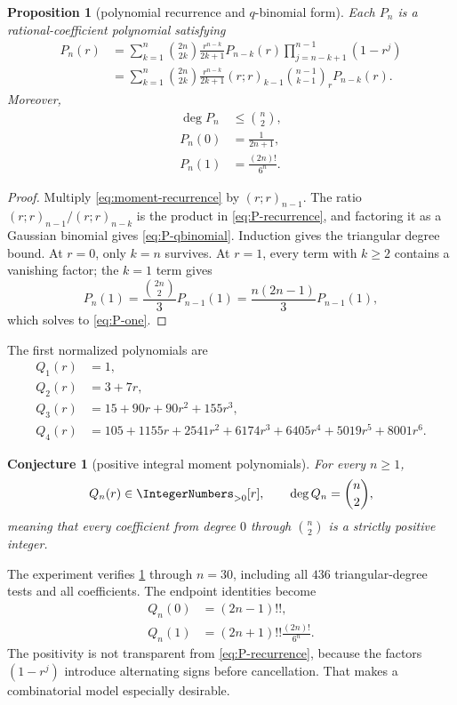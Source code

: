 \documentclass[11pt,oneside]{article}
\newtheorem{proposition}[theorem]{Proposition}
\newtheorem{conjecture}[theorem]{Conjecture}
\theoremstyle{definition}
\theoremstyle{remark}
\begin{document}
\begin{proposition}[polynomial recurrence and $q$-binomial form]\label{prop:P-recurrence}
Each $P_n$ is a rational-coefficient polynomial satisfying
\begin{align}
 P_n(r)
 &=\sum_{k=1}^n\binom{2n}{2k}\frac{r^{n-k}}{2k+1}
 P_{n-k}(r)\prod_{j=n-k+1}^{n-1}(1-r^j)\label{eq:P-recurrence}\\
 &=\sum_{k=1}^n\binom{2n}{2k}\frac{r^{n-k}}{2k+1}
 (r;r)_{k-1}\binom{n-1}{k-1}_rP_{n-k}(r).
 \label{eq:P-qbinomial}
\end{align}
Moreover,
\begin{align}
 \deg P_n&\le\binom n2,\label{eq:P-degree-bound}\\
 P_n(0)&=\frac1{2n+1},\label{eq:P-zero}\\
 P_n(1)&=\frac{(2n)!}{6^n}.
 \label{eq:P-one}
\end{align}
\end{proposition}

\begin{proof}
Multiply \cref{eq:moment-recurrence} by $(r;r)_{n-1}$.  The ratio
$(r;r)_{n-1}/(r;r)_{n-k}$ is the product in \cref{eq:P-recurrence}, and factoring it as a Gaussian binomial gives \cref{eq:P-qbinomial}.  Induction gives the triangular degree bound.  At $r=0$, only $k=n$ survives.  At $r=1$, every term with $k\ge2$ contains a vanishing factor; the $k=1$ term gives
\[
 P_n(1)=\frac{\binom{2n}{2}}3P_{n-1}(1)
 =\frac{n(2n-1)}3P_{n-1}(1),
\]
which solves to \cref{eq:P-one}.
\end{proof}

The first normalized polynomials are
\begin{align*}
 Q_1(r)&=1,\\
 Q_2(r)&=3+7r,\\
 Q_3(r)&=15+90r+90r^2+155r^3,\\
 Q_4(r)&=105+1155r+2541r^2+6174r^3+6405r^4+5019r^5+8001r^6.
\end{align*}

\begin{conjecture}[positive integral moment polynomials]\label{conj:moment-polynomial}
For every $n\ge1$,
\begin{equation}\label{eq:Q-positive}
 Q_n(r)\in\IntegerNumbers_{>0}[r],
 \qquad
 \deg Q_n=\binom n2,
\end{equation}
meaning that every coefficient from degree $0$ through $\binom n2$ is a strictly positive integer.
\end{conjecture}

The experiment verifies \cref{conj:moment-polynomial} through $n=30$, including all $436$ triangular-degree tests and all coefficients.  The endpoint identities become
\begin{align}
 Q_n(0)&=(2n-1)!!,\label{eq:Q-zero}\\
 Q_n(1)&=(2n+1)!!\frac{(2n)!}{6^n}.
 \label{eq:Q-one}
\end{align}
The positivity is not transparent from \cref{eq:P-recurrence}, because the factors $(1-r^j)$ introduce alternating signs before cancellation.  That makes a combinatorial model especially desirable.
\end{document}

